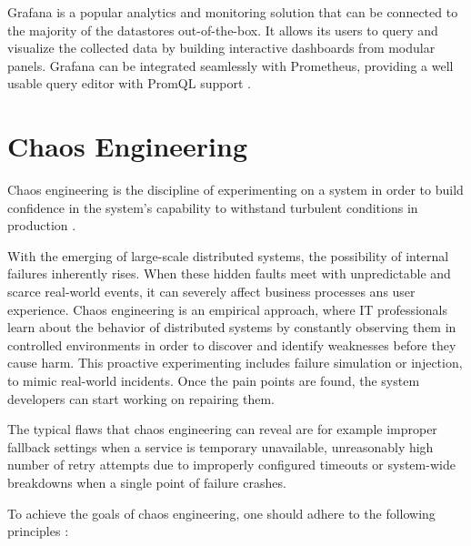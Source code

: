 Grafana is a popular analytics and monitoring solution that can be connected to the majority of the datastores out-of-the-box. It allows its users to query and visualize the collected data by building interactive dashboards from modular panels. Grafana can be integrated seamlessly with Prometheus, providing a well usable query editor with PromQL support \cite{Grafana}.


\section{Chaos Engineering} \label{backgroun-chaos-eng}

Chaos engineering is the discipline of experimenting on a system in order to build confidence in the system’s capability to withstand turbulent conditions in production \cite{PrinciplesOfChaos}.

With the emerging of large-scale distributed systems, the possibility of internal failures inherently rises. When these hidden faults meet with unpredictable and scarce real-world events, it can severely affect business processes ans user experience. Chaos engineering is an empirical approach, where IT professionals learn about the behavior of distributed systems by constantly observing them in controlled environments in order to discover and identify weaknesses before they cause harm. This proactive experimenting includes failure simulation or injection, to mimic real-world incidents. Once the pain points are found, the system developers can start working on repairing them.

The typical flaws that chaos engineering can reveal are for example improper fallback settings when a service is temporary unavailable, unreasonably high number of retry attempts due to improperly configured timeouts or system-wide breakdowns when a single point of failure crashes.

To achieve the goals of chaos engineering, one should adhere to the following principles \cite{PrinciplesOfChaos}:

